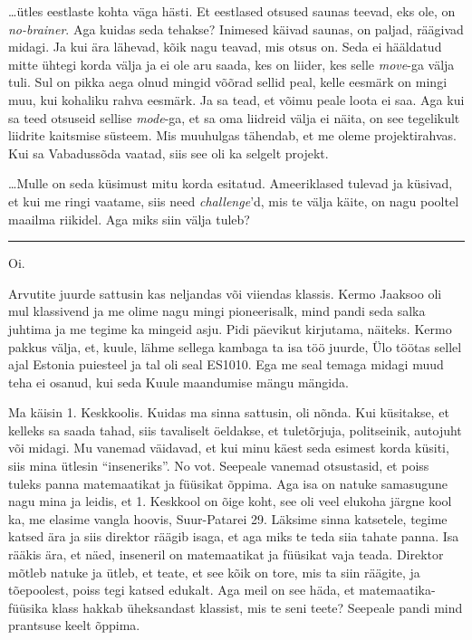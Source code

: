 
\ldots ütles eestlaste kohta väga hästi. Et eestlased otsused saunas 
teevad, eks ole, on \emph{no-brainer}. Aga kuidas seda tehakse? 
Inimesed käivad saunas, on paljad, räägivad midagi. Ja  kui ära 
lähevad, kõik nagu teavad, mis otsus on. Seda ei hääldatud mitte ühtegi korda välja 
ja ei ole aru saada, kes on liider, kes selle \emph{move}-ga välja tuli. 
Sul on pikka aega olnud mingid võõrad sellid peal, 
kelle eesmärk on mingi muu, kui kohaliku rahva eesmärk. Ja sa tead, et võimu 
peale loota ei saa. Aga kui sa teed otsuseid sellise \emph{mode}-ga, et sa oma 
liidreid välja ei näita, on see tegelikult liidrite kaitsmise süsteem. Mis 
muuhulgas tähendab, et me oleme projektirahvas. Kui sa  Vabadussõda vaatad, 
siis see oli ka selgelt projekt.
                 
\ldots Mulle on seda küsimust mitu korda esitatud. Ameeriklased tulevad ja 
küsivad, et kui me ringi vaatame, siis need \emph{challenge}'d, mis te 
välja käite, on nagu pooltel maailma riikidel. Aga miks siin välja tuleb?

\bigskip
\noindent\rule{.3\textwidth}{.7pt}
\bigskip
                 

Oi.

Arvutite juurde  sattusin kas neljandas või viiendas klassis. Kermo 
Jaaksoo  oli mul  klassivend ja me olime nagu mingi 
pioneerisalk, mind pandi seda salka juhtima ja me tegime ka 
mingeid asju. Pidi päevikut kirjutama, näiteks. Kermo pakkus välja, et, 
kuule, lähme sellega kambaga ta isa töö juurde, Ülo töötas sellel ajal 
Estonia puiesteel ja tal oli seal ES1010. Ega me seal temaga midagi muud teha ei 
osanud, kui seda Kuule maandumise mängu mängida. 

Ma käisin 1. Keskkoolis.  Kuidas ma sinna 
sattusin, oli  nõnda. Kui küsitakse, et kelleks sa saada tahad, siis tavaliselt 
öeldakse, et  tuletõrjuja, politseinik, autojuht või midagi. Mu vanemad väidavad, 
et kui minu käest seda esimest korda küsiti, siis mina ütlesin \enquote{inseneriks}. 
No vot. Seepeale 
vanemad otsustasid, et poiss tuleks panna matemaatikat ja füüsikat õppima. Aga 
isa on natuke samasugune nagu mina ja leidis, et 1. Keskkool on õige koht, see 
oli veel elukoha järgne kool ka, me elasime vangla hoovis,  Suur-Patarei 29. 
Läksime sinna katsetele, tegime katsed ära ja siis direktor räägib isaga, et 
aga miks te teda siia tahate panna. Isa rääkis ära, et näed, inseneril on 
matemaatikat ja füüsikat vaja teada. Direktor mõtleb natuke ja ütleb, et teate, 
et see kõik on tore, mis ta siin räägite, ja tõepoolest, poiss tegi katsed 
edukalt. Aga meil on see häda, et matemaatika-füüsika klass hakkab üheksandast 
klassist, mis te seni teete? Seepeale pandi mind prantsuse keelt õppima.

